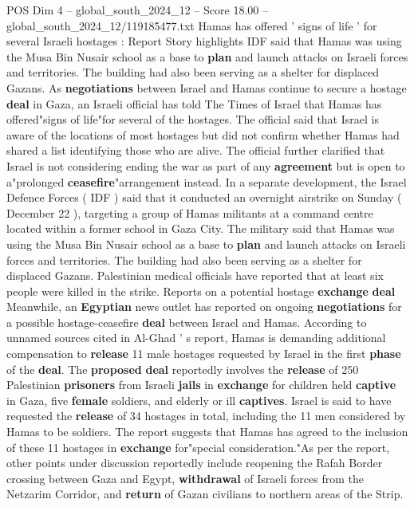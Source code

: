 \begin{textsample}{POS Dim 4 – global\_south\_2024\_12 – Score 18.00 – global\_south\_2024\_12/119185477.txt}  \label{ex:f4_pos_237}
Hamas has offered ' signs of life ' for several Israeli hostages : Report Story highlights IDF said that Hamas was using the Musa Bin Nusair school as a base to \textbf{plan} and launch attacks on Israeli forces and territories.
The building had also been serving as a shelter for displaced Gazans.
As \textbf{negotiations} between Israel and Hamas continue to secure a hostage \textbf{deal} in Gaza, an Israeli official has told The Times of Israel that Hamas has offered"signs of life"for several of the hostages.
The official said that Israel is aware of the locations of most hostages but did not confirm whether Hamas had shared a list identifying those who are alive.
The official further clarified that Israel is not considering ending the war as part of any \textbf{agreement} but is open to a"prolonged \textbf{ceasefire}"arrangement instead.
In a separate development, the Israel Defence Forces ( IDF ) said that it conducted an overnight airstrike on Sunday ( December 22 ), targeting a group of Hamas militants at a command centre located within a former school in Gaza City.
The military said that Hamas was using the Musa Bin Nusair school as a base to \textbf{plan} and launch attacks on Israeli forces and territories.
The building had also been serving as a shelter for displaced Gazans.
Palestinian medical officials have reported that at least six people were killed in the strike.
Reports on a potential hostage \textbf{exchange} \textbf{deal} Meanwhile, an \textbf{Egyptian} news outlet has reported on ongoing \textbf{negotiations} for a possible hostage-ceasefire \textbf{deal} between Israel and Hamas.
According to unnamed sources cited in Al-Ghad ' s report, Hamas is demanding additional compensation to \textbf{release} 11 male hostages requested by Israel in the first \textbf{phase} of the \textbf{deal}.
The \textbf{proposed} \textbf{deal} reportedly involves the \textbf{release} of 250 Palestinian \textbf{prisoners} from Israeli \textbf{jails} in \textbf{exchange} for children held \textbf{captive} in Gaza, five \textbf{female} soldiers, and elderly or ill \textbf{captives}.
Israel is said to have requested the \textbf{release} of 34 hostages in total, including the 11 men considered by Hamas to be soldiers.
The report suggests that Hamas has agreed to the inclusion of these 11 hostages in \textbf{exchange} for"special consideration."As per the report, other points under discussion reportedly include reopening the Rafah Border crossing between Gaza and Egypt, \textbf{withdrawal} of Israeli forces from the Netzarim Corridor, and \textbf{return} of Gazan civilians to northern areas of the Strip.

\end{textsample}
